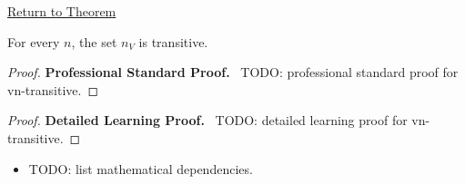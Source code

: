 \newpage
{}
\label{prf:vn-transitive}

\begin{remark*}[Return]
\hyperref[prop:vn-transitive]{Return to Theorem}
\end{remark*}

\begin{theorem*}
For every $n$, the set $n_V$ is transitive.
\end{theorem*}

\begin{proof}
\textbf{Professional Standard Proof.}~
TODO: professional standard proof for vn-transitive.
\end{proof}

\begin{proof}
\textbf{Detailed Learning Proof.}~
TODO: detailed learning proof for vn-transitive.
\end{proof}

\begin{remark*}
\end{remark*}

\begin{dependencies}
\begin{itemize}
  \item TODO: list mathematical dependencies.
\end{itemize}
\end{dependencies}

\clearpage
